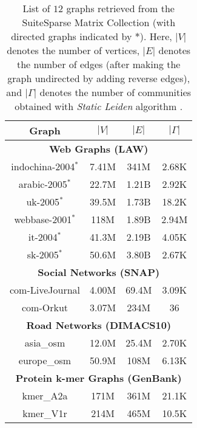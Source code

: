 \begin{table}[hbtp]
  \centering
  \caption{List of $12$ graphs retrieved from the SuiteSparse Matrix Collection \cite{suite19} (with directed graphs indicated by $*$). Here, $|V|$ denotes the number of vertices, $|E|$ denotes the number of edges (after making the graph undirected by adding reverse edges), and $|\Gamma|$ denotes the number of communities obtained with \textit{Static Leiden} algorithm \cite{sahu2023gveleiden}.}
  \label{tab:dataset-large}
  \begin{tabular}{|c||c|c|c|}
    \toprule
    \textbf{Graph} &
    \textbf{\textbf{$|V|$}} &
    \textbf{\textbf{$|E|$}} &
    \textbf{\textbf{$|\Gamma|$}} \\
    \midrule
    \multicolumn{4}{|c|}{\textbf{Web Graphs (LAW)}} \\ \hline
    indochina-2004$^*$ & 7.41M & 341M & 2.68K \\ \hline
    arabic-2005$^*$ & 22.7M & 1.21B & 2.92K \\ \hline
    uk-2005$^*$ & 39.5M & 1.73B & 18.2K \\ \hline
    webbase-2001$^*$ & 118M & 1.89B & 2.94M \\ \hline
    it-2004$^*$ & 41.3M & 2.19B & 4.05K \\ \hline
    sk-2005$^*$ & 50.6M & 3.80B & 2.67K \\ \hline
    \multicolumn{4}{|c|}{\textbf{Social Networks (SNAP)}} \\ \hline
    com-LiveJournal & 4.00M & 69.4M & 3.09K \\ \hline
    com-Orkut & 3.07M & 234M & 36 \\ \hline
    \multicolumn{4}{|c|}{\textbf{Road Networks (DIMACS10)}} \\ \hline
    asia\_osm & 12.0M & 25.4M & 2.70K \\ \hline
    europe\_osm & 50.9M & 108M & 6.13K \\ \hline
    \multicolumn{4}{|c|}{\textbf{Protein k-mer Graphs (GenBank)}} \\ \hline
    kmer\_A2a & 171M & 361M & 21.1K \\ \hline
    kmer\_V1r & 214M & 465M & 10.5K \\ \hline
  \bottomrule
  \end{tabular}
\end{table}
